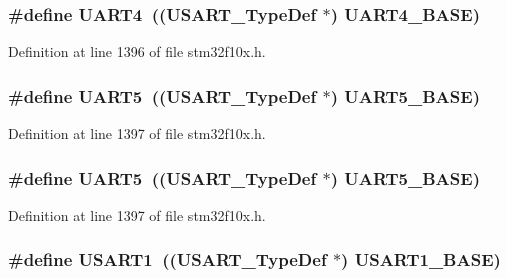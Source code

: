 \subsubsection[{\texorpdfstring{U\+A\+R\+T4}{UART4}}]{\setlength{\rightskip}{0pt plus 5cm}\#define U\+A\+R\+T4~(({\bf U\+S\+A\+R\+T\+\_\+\+Type\+Def} $\ast$) {\bf U\+A\+R\+T4\+\_\+\+B\+A\+SE})}\hypertarget{group___peripheral__declaration_ga7c035f6f443c999fc043b2b7fb598800}{}\label{group___peripheral__declaration_ga7c035f6f443c999fc043b2b7fb598800}


Definition at line 1396 of file stm32f10x.\+h.

\subsubsection[{\texorpdfstring{U\+A\+R\+T5}{UART5}}]{\setlength{\rightskip}{0pt plus 5cm}\#define U\+A\+R\+T5~(({\bf U\+S\+A\+R\+T\+\_\+\+Type\+Def} $\ast$) {\bf U\+A\+R\+T5\+\_\+\+B\+A\+SE})}\hypertarget{group___peripheral__declaration_ga9274e37cf5e8a174fc5dd627b98ec0fe}{}\label{group___peripheral__declaration_ga9274e37cf5e8a174fc5dd627b98ec0fe}


Definition at line 1397 of file stm32f10x.\+h.

\subsubsection[{\texorpdfstring{U\+A\+R\+T5}{UART5}}]{\setlength{\rightskip}{0pt plus 5cm}\#define U\+A\+R\+T5~(({\bf U\+S\+A\+R\+T\+\_\+\+Type\+Def} $\ast$) {\bf U\+A\+R\+T5\+\_\+\+B\+A\+SE})}\hypertarget{group___peripheral__declaration_ga9274e37cf5e8a174fc5dd627b98ec0fe}{}\label{group___peripheral__declaration_ga9274e37cf5e8a174fc5dd627b98ec0fe}


Definition at line 1397 of file stm32f10x.\+h.

\subsubsection[{\texorpdfstring{U\+S\+A\+R\+T1}{USART1}}]{\setlength{\rightskip}{0pt plus 5cm}\#define U\+S\+A\+R\+T1~(({\bf U\+S\+A\+R\+T\+\_\+\+Type\+Def} $\ast$) {\bf U\+S\+A\+R\+T1\+\_\+\+B\+A\+SE})}\hypertarget{group___peripheral__declaration_ga92871691058ff7ccffd7635930cb08da}{}\label{group___peripheral__declaration_ga92871691058ff7ccffd7635930cb08da}


